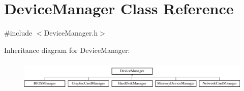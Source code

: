 \hypertarget{classDeviceManager}{}\section{Device\+Manager Class Reference}
\label{classDeviceManager}


{\ttfamily \#include $<$Device\+Manager.\+h$>$}

Inheritance diagram for Device\+Manager\+:\begin{figure}[H]
\begin{center}
\leavevmode
\includegraphics[height=1.426752cm]{classDeviceManager}
\end{center}
\end{figure}
